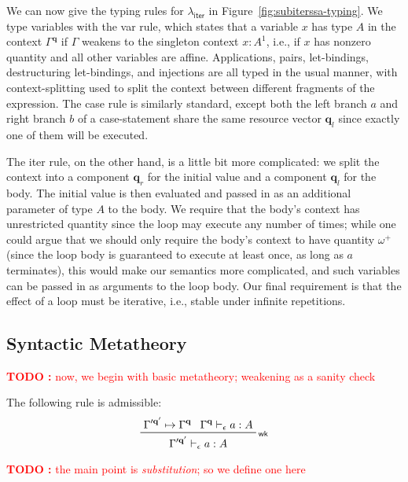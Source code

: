 \documentclass[acmsmall,screen,review]{acmart}
\newcounter{todos}
\newcommand{\TODO}[1]{{
  \stepcounter{todos}
  \begin{center}\large{\textcolor{red}{\textbf{TODO \arabic{todos}:} #1}}\end{center}
}}
\newcommand{\mb}[1]{\ensuremath{\mathbf{#1}}}
\newcommand{\ms}[1]{\ensuremath{\mathsf{#1}}}
\newcommand{\cwk}[2]{#1 \mapsto #2}
\newcommand{\rle}[1]{{\scriptsize\textsf{#1}}}
\newcommand{\hasty}[4]{#1 \vdash_{#2} #3: {#4}}
\newcommand{\brle}[1]{{\textsf{#1}}}
\newcommand{\subiterssa}{\(\lambda_{\ms{iter}}\)}
\newcommand{\oneq}{1}
\newcommand{\cpyq}{\omega^+}
\begin{document}
We can now give the typing rules for \subiterssa{} in Figure~\ref{fig:subiterssa-typing}. We type
variables with the \brle{var} rule, which states that a variable $x$ has type $A$ in the context
$\Gamma^{\mb{q}}$ if $\Gamma$ weakens to the singleton context $x: A^\oneq$, i.e., if $x$ has
nonzero quantity and all other variables are affine. Applications, pairs, let-bindings,
destructuring let-bindings, and injections are all typed in the usual manner, with context-splitting
used to split the context between different fragments of the expression. The \brle{case} rule is
similarly standard, except both the left branch $a$ and right branch $b$ of a case-statement share
the same resource vector $\mb{q}_l$ since exactly one of them will be executed.

The \brle{iter} rule, on the other hand, is a little bit more complicated: we split the context into
a component $\mb{q}_r$ for the initial value and a component $\mb{q}_l$ for the body. The initial
value is then evaluated and passed in as an additional parameter of type $A$ to the body. We require
that the body's context has unrestricted quantity since the loop may execute any number of times;
while one could argue that we should only require the body's context to have quantity $\cpyq$ (since
the loop body is guaranteed to execute at least once, as long as $a$ terminates), this would make
our semantics more complicated, and such variables can be passed in as arguments to the loop body.
Our final requirement is that the effect of a loop must be iterative, i.e., stable under infinite
repetitions.

\subsection{Syntactic Metatheory}

\TODO{now, we begin with basic metatheory; weakening as a sanity check}

\begin{lemma}[name=Weakening, restate=synmonwk]
  The following rule is admissible:
  \begin{equation*}
    \prftree[r]{\rle{wk}}
      {\cwk{\Gamma'^{\mb{q}'}}{\Gamma^{\mb{q}}}}
      {\hasty{\Gamma^{\mb{q}}}{\epsilon}{a}{A}}
      {\hasty{\Gamma'^{\mb{q}'}}{\epsilon}{a}{A}}
  \end{equation*}
\end{lemma}

\TODO{the main point is \emph{substitution}; so we define one here}
\end{document}

